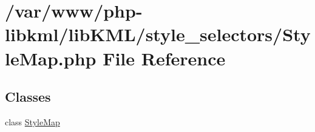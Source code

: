 \hypertarget{StyleMap_8php}{
\section{/var/www/php-\/libkml/libKML/style\_\-selectors/StyleMap.php File Reference}
\label{dc/db8/StyleMap_8php}
}
\subsection*{Classes}
\begin{DoxyCompactItemize}
\item 
class \hyperlink{classStyleMap}{StyleMap}
\end{DoxyCompactItemize}
